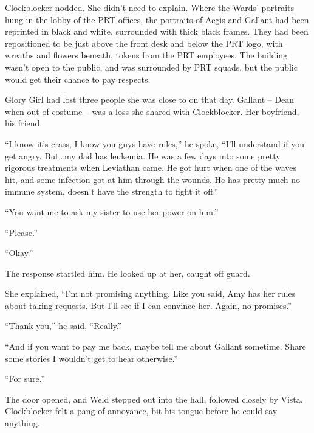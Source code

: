 Clockblocker nodded.  She didn't need to explain.  Where the Wards' portraits hung in the lobby of the PRT offices, the portraits of Aegis and Gallant had been reprinted in black and white, surrounded with thick black frames.  They had been repositioned to be just above the front desk and below the PRT logo, with wreaths and flowers beneath, tokens from the PRT employees.  The building wasn't open to the public, and was surrounded by PRT squads, but the public would get their chance to pay respects.



Glory Girl had lost three people she was close to on that day.  Gallant – Dean when out of costume – was a loss she shared with Clockblocker.  Her boyfriend, his friend.



``I know it's crass, I know you guys have rules,'' he spoke, ``I'll understand if you get angry.  But\ldots my dad has leukemia.  He was a few days into some pretty rigorous treatments when Leviathan came.  He got hurt when one of the waves hit, and some infection got at him through the wounds.  He has pretty much no immune system, doesn't have the strength to fight it off.''



``You want me to ask my sister to use her power on him.''



``Please.''



``Okay.''



The response startled him.  He looked up at her, caught off guard.



She explained, ``I'm not promising anything.  Like you said, Amy has her rules about taking requests.  But I'll see if I can convince her.  Again, no promises.''



``Thank you,'' he said, ``Really.''



``And if you want to pay me back, maybe tell me about Gallant sometime.  Share some stories I wouldn't get to hear otherwise.''



``For sure.''



The door opened, and Weld stepped out into the hall, followed closely by Vista.  Clockblocker felt a pang of annoyance, bit his tongue before he could say anything.



